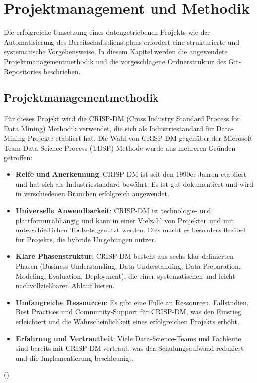 \documentclass[%
pdftex,
oneside,			%
11pt,				%
parskip=half,		%
headheight = 12pt,	%
headsepline,		%
footsepline,		%
footheight = 16pt,	%
abstracton,		%
DIV=calc,		%
BCOR=8mm,		%
headinclude=false,	%
footinclude=false,	%
listof=totoc,		%
toc=bibliography,	%
]{scrreprt}	%
\begin{document}
\chapter{Projektmanagement und Methodik}

    Die erfolgreiche Umsetzung eines datengetriebenen Projekts wie der Automatisierung des Bereitschaftsdienstplans erfordert eine strukturierte und systematische Vorgehensweise. 
    In diesem Kapitel werden die angewendete Projektmanagementmethodik und die vorgeschlagene Ordnerstruktur des Git-Repositories beschrieben.

    \section{Projektmanagementmethodik}

        Für dieses Projekt wird die CRISP-DM (Cross Industry Standard Process for Data Mining) Methodik verwendet, die sich als Industriestandard für Data-Mining-Projekte etabliert hat. 
        Die Wahl von CRISP-DM gegenüber der Microsoft Team Data Science Process (TDSP) Methode wurde aus mehreren Gründen getroffen:

        \begin{itemize}
            \item \textbf{Reife und Anerkennung}: CRISP-DM ist seit den 1990er Jahren etabliert und hat sich als Industriestandard bewährt. 
            Es ist gut dokumentiert und wird in verschiedenen Branchen erfolgreich angewendet.
            \item \textbf{Universelle Anwendbarkeit}: CRISP-DM ist technologie- und plattformunabhängig und kann in einer Vielzahl von Projekten und mit unterschiedlichen Toolsets genutzt werden. 
            Dies macht es besonders flexibel für Projekte, die hybride Umgebungen nutzen.
            \item \textbf{Klare Phasenstruktur}: CRISP-DM besteht aus sechs klar definierten Phasen (Business Understanding, Data Understanding, Data Preparation, Modeling, Evaluation, Deployment), die einen systematischen und leicht nachvollziehbaren Ablauf bieten.
            \item \textbf{Umfangreiche Ressourcen}: Es gibt eine Fülle an Ressourcen, Fallstudien, Best Practices und Community-Support für CRISP-DM, was den Einstieg erleichtert und die Wahrscheinlichkeit eines erfolgreichen Projekts erhöht.
            \item \textbf{Erfahrung und Vertrautheit}: Viele Data-Science-Teams und Fachleute sind bereits mit CRISP-DM vertraut, was den Schulungsaufwand reduziert und die Implementierung beschleunigt.
        \end{itemize}
        (\cite[Vgl.][]{crisp_vs_tdsp}) %
\end{document}
